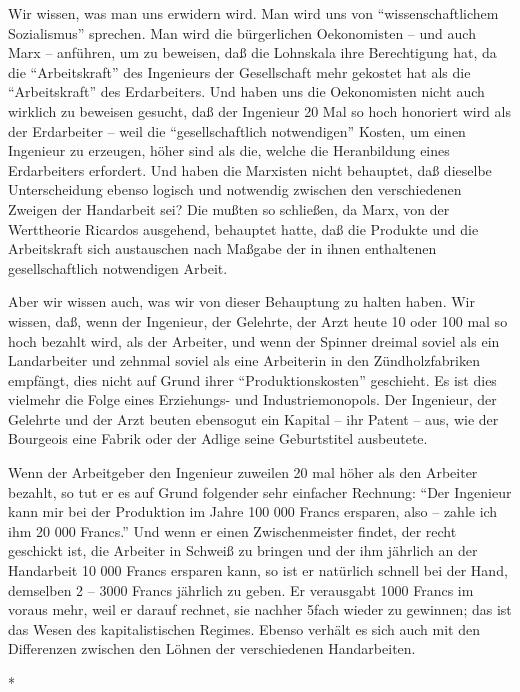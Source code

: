 \documentclass{scrbook}
\begin{document}
Wir wissen, was man uns erwidern wird. Man wird uns von ``wissenschaftlichem Sozialismus'' sprechen. Man wird die bürgerlichen Oekonomisten – und auch Marx – anführen, um zu beweisen, daß die Lohnskala ihre Berechtigung hat, da die ``Arbeitskraft'' des Ingenieurs der Gesellschaft mehr gekostet hat als die ``Arbeitskraft'' des Erdarbeiters. Und haben uns die Oekonomisten nicht auch wirklich zu beweisen gesucht, daß der Ingenieur 20 Mal so hoch honoriert wird als der Erdarbeiter – weil die ``gesellschaftlich notwendigen'' Kosten, um einen Ingenieur zu erzeugen, höher sind als die, welche die Heranbildung eines Erdarbeiters erfordert. Und haben die Marxisten nicht behauptet, daß dieselbe Unterscheidung ebenso logisch und notwendig zwischen den verschiedenen Zweigen der Handarbeit sei? Die mußten so schließen, da Marx, von der Werttheorie Ricardos ausgehend, behauptet hatte, daß die Produkte und die Arbeitskraft sich austauschen nach Maßgabe der in ihnen enthaltenen gesellschaftlich notwendigen Arbeit.

Aber wir wissen auch, was wir von dieser Behauptung zu halten haben. Wir wissen, daß, wenn der Ingenieur, der Gelehrte, der Arzt heute 10 oder 100 mal so hoch bezahlt wird, als der Arbeiter, und wenn der Spinner dreimal soviel als ein Landarbeiter und zehnmal soviel als eine Arbeiterin in den Zündholzfabriken empfängt, dies nicht auf Grund ihrer ``Produktionskosten'' geschieht. Es ist dies vielmehr die Folge eines Erziehungs- und Industriemonopols. Der Ingenieur, der Gelehrte und der Arzt beuten ebensogut ein Kapital – ihr Patent – aus, wie der Bourgeois eine Fabrik oder der Adlige seine Geburtstitel ausbeutete.

Wenn der Arbeitgeber den Ingenieur zuweilen 20 mal höher als den Arbeiter bezahlt, so tut er es auf Grund folgender sehr einfacher Rechnung: ``Der Ingenieur kann mir bei der Produktion im Jahre 100 000 Francs ersparen, also – zahle ich ihm 20 000 Francs.'' Und wenn er einen Zwischenmeister findet, der recht geschickt ist, die Arbeiter in Schweiß zu bringen und der ihm jährlich an der Handarbeit 10 000 Francs ersparen kann, so ist er natürlich schnell bei der Hand, demselben 2 – 3000 Francs jährlich zu geben. Er verausgabt 1000 Francs im voraus mehr, weil er darauf rechnet, sie nachher 5fach wieder zu gewinnen; das ist das Wesen des kapitalistischen Regimes. Ebenso verhält es sich auch mit den Differenzen zwischen den Löhnen der verschiedenen Handarbeiten.

\begin{center}*\end{center}
\end{document}

